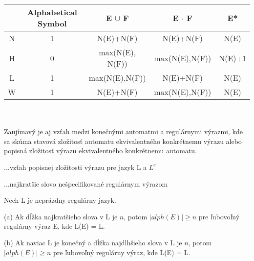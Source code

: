 \begin{tabular}{|c||c|c|c|c|}
\hline
 ~ & Alphabetical Symbol & E $\cup$ F & E $\cdot$ F & E*
\\ \hline\hline
N & 1 & N(E)+N(F) & N(E)+N(F) & N(E)
\\ \hline 
H & 0 & max(N(E), N(F)) & max(N(E),N(F)) & N(E)+1
\\ \hline
L & 1 & max(N(E),N(F)) & N(E)+N(F) & N(E)
\\ \hline
W & 1 & N(E)+N(F) & max(N(E),N(F)) & N(E)
\\ \hline
\end{tabular}
\\ \\


Zaujímavý je aj vzťah medzi konečnými automatmi a regulárnymi výrazmi, kde sa skúma stavová zložitosť automatu ekvivalentného konkrétnemu výrazu alebo popisná zložitosť výrazu ekvivalentného konkrétnemu automatu.

...vzťah popisnej zložitosti výrazu pre jazyk L a $L^c$

...najkratšie slovo nešpecifikované regulárnym výrazom

\begin{veta}
Nech L je neprázdny regulárny jazyk.

(a) Ak dĺžka najkratšieho slova v L je $n$, potom $|alph(E)| \geq n$ pre ľubovoľný regulárny výraz E, kde L(E) = L.

(b) Ak naviac L je konečný a dĺžka najdlhšieho slova v L je $n$, potom $|alph(E)| \geq n$ pre ľubovoľný regulárny výraz, kde L(E) = L.
\end{veta}


